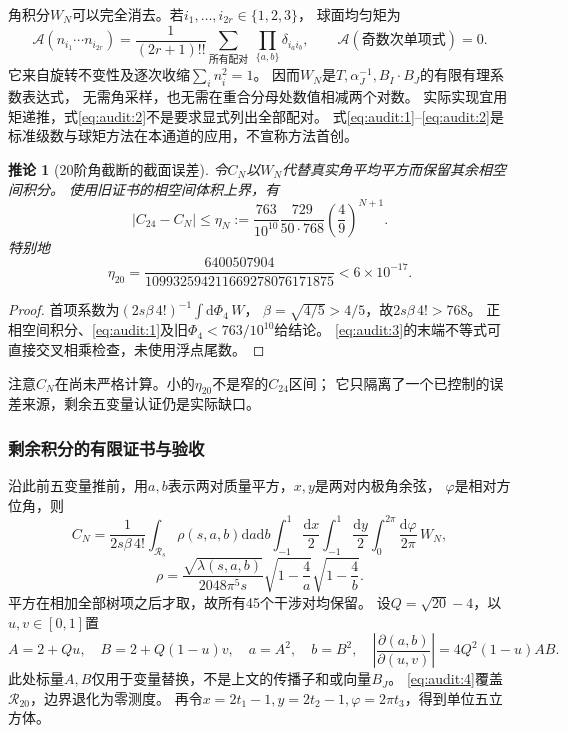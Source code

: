 \documentclass[11pt,a4paper]{ctexart}
\theoremstyle{cnplain}\newtheorem{theorem}{定理}[section]
\newtheorem{corollary}[theorem]{推论}
\theoremstyle{definition}\newtheorem{definition}[theorem]{定义}
\theoremstyle{remark}\newtheorem{remark}[theorem]{注}
\newcommand{\cA}{\mathcal A}
\newcommand{\dd}{\mathrm d}
\begin{document}
角积分$W_N$可以完全消去。若$i_1,\ldots,i_{2r}\in\{1,2,3\}$，
球面均匀矩为
\begin{equation}
 \cA(n_{i_1}\cdots n_{i_{2r}})
 =\frac1{(2r+1)!!}
   \sum_{\text{所有配对}}\ \prod_{\{a,b\}}\delta_{i_ai_b},
 \qquad \cA(\text{奇数次单项式})=0.                       \label{eq:audit:2}\end{equation}
它来自旋转不变性及逐次收缩$\sum_i n_i^2=1$。
因而$W_N$是$T,\alpha_J^{-1},B_I\cdot B_J$的有限有理系数表达式，
无需角采样，也无需在重合分母处数值相减两个对数。
实际实现宜用矩递推，式\eqref{eq:audit:2}不是要求显式列出全部配对。
式\eqref{eq:audit:1}--\eqref{eq:audit:2}是标准级数与球矩方法在本通道的应用，不宣称方法首创。

\begin{corollary}[20阶角截断的截面误差]\label{audit:cor:eta}
令$C_N$以$W_N$代替真实角平均平方而保留其余相空间积分。
使用旧证书的相空间体积上界，有
\[
 |C_{24}-C_N|
 \le\eta_N:=
 \frac{763}{10^{10}}\frac{729}{50\cdot768}
          \left(\frac49\right)^{N+1}.
\]
特别地
\begin{equation}
 \eta_{20}=
 \frac{6400507904}{109932594211669278076171875}
 <6\times10^{-17}.                                    \label{eq:audit:3}\end{equation}
\end{corollary}
\begin{proof}
首项系数为$(2s\beta\,4!)^{-1}\int \dd\Phi_4\,W$，
$\beta=\sqrt{4/5}>4/5$，故$2s\beta\,4!>768$。
正相空间积分、\eqref{eq:audit:1}及旧$\Phi_4<763/10^{10}$给结论。
\eqref{eq:audit:3}的末端不等式可直接交叉相乘检查，未使用浮点尾数。
\end{proof}

注意$C_N$在尚未严格计算。小的$\eta_{20}$不是窄的$C_{24}$区间；
它只隔离了一个已控制的误差来源，剩余五变量认证仍是实际缺口。

\subsubsection{剩余积分的有限证书与验收}
沿此前五变量推前，用$a,b$表示两对质量平方，$x,y$是两对内极角余弦，
$\varphi$是相对方位角，则
\[
 C_N=\frac1{2s\beta\,4!}
 \int_{\mathcal R_s}\rho(s,a,b)\dd a\dd b
 \int_{-1}^1\frac{\dd x}2\int_{-1}^1\frac{\dd y}2
 \int_0^{2\pi}\frac{\dd\varphi}{2\pi}\,W_N,
\]
\[
 \rho=\frac{\sqrt{\lambda(s,a,b)}}{2048\pi^5s}
          \sqrt{1-\frac4a}\sqrt{1-\frac4b}.
\]
平方在相加全部树项之后才取，故所有45个干涉对均保留。
设$Q=\sqrt{20}-4$，以$u,v\in[0,1]$置
\begin{equation}
 A=2+Qu,\quad B=2+Q(1-u)v,\quad a=A^2,\quad b=B^2,
 \quad \left|\frac{\partial(a,b)}{\partial(u,v)}\right|
       =4Q^2(1-u)AB.                                   \label{eq:audit:4}\end{equation}
此处标量$A,B$仅用于变量替换，不是上文的传播子和或向量$B_J$。
\eqref{eq:audit:4}覆盖$\mathcal R_{20}$，边界退化为零测度。
再令$x=2t_1-1,y=2t_2-1,\varphi=2\pi t_3$，得到单位五立方体。
\end{document}
